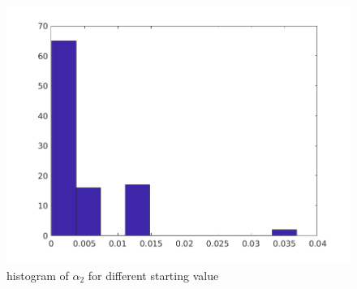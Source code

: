 \documentclass[12pt]{article}
\newcommand{\1}{{\bf 1}} %
\begin{document}
\begin{figure}
	\centering
	\includegraphics[width=0.7\linewidth]{../output/alpha2}
	\caption{histogram of $\alpha_2$ for different starting value}
	\label{fig:alpha2}
\end{figure}
\end{document}
